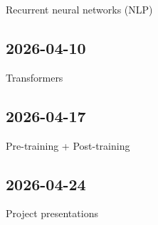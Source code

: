 \documentclass[11pt]{article}
\begin{document}
\begin{flushleft}
        Recurrent neural networks (NLP)

        \subsection{2026-04-10}
        \label{section-10}

        Transformers

        \subsection{2026-04-17}
        \label{section-11}

        Pre-training + Post-training

        \subsection{2026-04-24}
        \label{section-12}

        Project presentations
    \end{flushleft}
\end{document}
